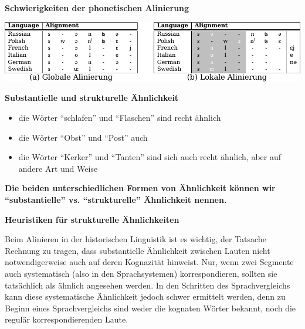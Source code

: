 \vspace{0.5cm}\par\noindent\textbf{Schwierigkeiten der phonetischen Alinierung}\vspace{0.5cm}

\includegraphics[width=\textwidth]{img/phonalign.pdf}



\vspace{0.5cm}\par\noindent\textbf{Substantielle und strukturelle Ähnlichkeit}\vspace{0.5cm}

\begin{itemize}
\itemsep1pt\parskip0pt
\item
  die Wörter ``schlafen'' und ``Flaschen'' sind recht ähnlich
\item
  die Wörter ``Obst'' und ``Post'' auch
\item
  die Wörter ``Kerker'' und ``Tanten'' sind sich auch recht ähnlich,
  aber auf andere Art und Weise
\end{itemize}

\vspace{0.5cm}\par\noindent\textbf{Die beiden unterschiedlichen Formen von Ähnlichkeit können wir\vspace{0.5cm}
``substantielle'' vs. ``strukturelle'' Ähnlichkeit nennen.}



\vspace{0.5cm}\par\noindent\textbf{Heuristiken für strukturelle Ähnlichkeiten}\vspace{0.5cm}

Beim Alinieren in der historischen Linguistik ist es wichtig, der
Tatsache Rechnung zu tragen, dass substantielle Ähnlichkeit zwischen
Lauten nicht notwendigerweise auch auf deren Kognazität hinweist. Nur,
wenn zwei Segmente auch systematisch (also in den Sprachsystemen)
korrespondieren, sollten sie tatsächlich als ähnlich angesehen werden.
In den Schritten des Sprachvergleichs kann diese systematische
Ähnlichkeit jedoch schwer ermittelt werden, denn zu Beginn eines
Sprachvergleichs sind weder die kognaten Wörter bekannt, noch die
regulär korrespondierenden Laute.



